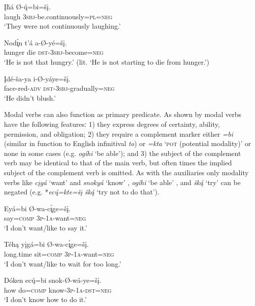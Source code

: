 \documentclass[output=paper,colorlinks,citecolor=brown]{langscibook}
\begin{document}
\ea\label{ex:nak:6}
    \ea\label{ex:nak:6a}
        \gll \k{I}ȟá Ø-\'{ų}=bi=šį. \\
             laugh \textsc{3sbj}-be.continuously=\textsc{pl=neg} \\
        \glt ‘They were not continuously laughing.’
    
    \ex\label{ex:nak:6b}
        \gll Nod\'{\k{ı}}n t’á a-Ø-yé=šį. \\
             hunger die \textsc{dst-3sbj}-become=\textsc{neg} \\
        \glt ‘He is not that hungry.’ (lit. ‘He is not starting to die from hunger.’) 
        
    \ex\label{ex:nak:6c}
        \gll \k{I}dé-ša-ya i-Ø-yáye=šį. \\
             face-red-\textsc{adv} \textsc{dst-3sbj}-gradually=\textsc{neg} \\
        \glt ‘He didn’t blush.’
    \z
\z 
 
Modal verbs can also function as primary predicate. As shown by \citet[392]{Cumberland2005} modal verbs have the following featuresː 1) they express degrees of certainty, ability, permission, and obligation; 2) they require a complement marker either \textit{=bi} (similar in function to English infinitival \textit{to}) or \textit{=kta} ‘\textsc{pot} (potential modality)’ or none in some cases (e.g. \textit{ogíhi} ‘be able’); and 3) the subject of the complement verb may be identical to that of the main verb, but often times the implied subject of the complement verb is omitted. As with the auxiliaries only modality verbs like \textit{cįgá} ‘want’  and \textit{snokyá} ‘know’ , \textit{ogíhi} ‘be able’ , and \textit{šk\'{ą}} ‘try’  can be negated (e.g. *\textit{ec\'{ų}=kte=šį šk\'{ą}} ‘try not to do that’).

\ea\label{ex:nak:7}
    \ea\label{ex:nak:7a}
        \gll Eyá=bi Ø-wa-c\'{\k{ı}}ge=šį. \\
             say=\textsc{comp} \textsc{3p-1a}-want=\textsc{neg} \\
        \glt ‘I don’t want/like to say it.’
    
    \ex\label{ex:nak:7b}
        \gll Téhą yįgá=bi Ø-wa-c\'{\k{ı}}ge=šį. \\
             long.time sit=\textsc{comp} \textsc{3p-1a}-want=\textsc{neg} \\
        \glt ‘I don’t want/like to wait for too long.’
    \z
\z 

\ea\label{ex:nak:8}
    \gll Dóken ec\'{ų}=bi snok-Ø-wá-ye=šį. \\
         how do=\textsc{comp} know-\textsc{3p-1a-dst=neg} \\
    \glt ‘I don’t know how to do it.’
\z 
\end{document}
